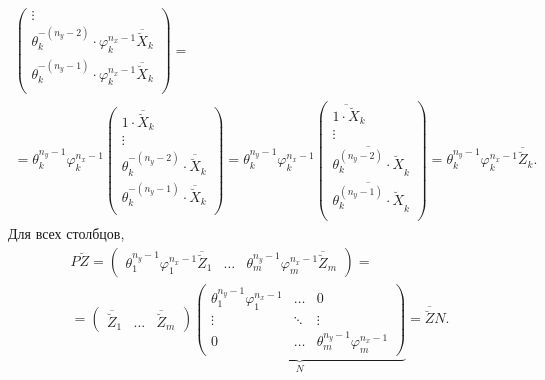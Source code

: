 \begin{multline*}
\begin{pmatrix}
        \vdots                                                                 \\
        \theta_k^{-(n_y - 2)} \cdot \varphi_k^{n_x - 1} \overline{\breve{X}}_k \\
        \theta_k^{-(n_y - 1)} \cdot \varphi_k^{n_x - 1} \overline{\breve{X}}_k \\
    \end{pmatrix} = \\
    = \theta_k^{n_y - 1} \varphi_k^{n_x - 1}
    \begin{pmatrix}
        1 \cdot \overline{\breve{X}}_k                     \\
        \vdots                                             \\
        \theta_k^{-(n_y - 2)} \cdot \overline{\breve{X}}_k \\
        \theta_k^{-(n_y - 1)} \cdot \overline{\breve{X}}_k \\
    \end{pmatrix}
    = \theta_k^{n_y - 1} \varphi_k^{n_x - 1}
    \begin{pmatrix}
        \overline{1 \cdot \breve{X}}_k                    \\
        \vdots                                            \\
        \overline{\theta_k^{(n_y - 2)} \cdot \breve{X}}_k \\
        \overline{\theta_k^{(n_y - 1)} \cdot \breve{X}}_k \\
    \end{pmatrix}
    = \theta_k^{n_y - 1} \varphi_k^{n_x - 1} \overline{\breve{Z}}_k .
\end{multline*}
Для всех столбцов,
\begin{multline*}
    P \breve{Z}
    =
    \begin{pmatrix}
        \theta_1^{n_y - 1} \varphi_1^{n_x - 1} \overline{\breve{Z}}_1 & \dots & \theta_m^{n_y - 1} \varphi_m^{n_x - 1} \overline{\breve{Z}}_m
    \end{pmatrix} = \\
    =
    \begin{pmatrix}
        \overline{\breve{Z}}_1 & \dots & \overline{\breve{Z}}_m
    \end{pmatrix}
    \underbrace{
        \begin{pmatrix}
            \theta_1^{n_y - 1} \varphi_1^{n_x - 1} & \dots  & 0                                      \\
            \vdots                                 & \ddots & \vdots                                 \\
            0                                      & \dots  & \theta_m^{n_y - 1} \varphi_m^{n_x - 1}
        \end{pmatrix}
    }_N
    =
    \overline{\breve{Z}} N .
\end{multline*}
